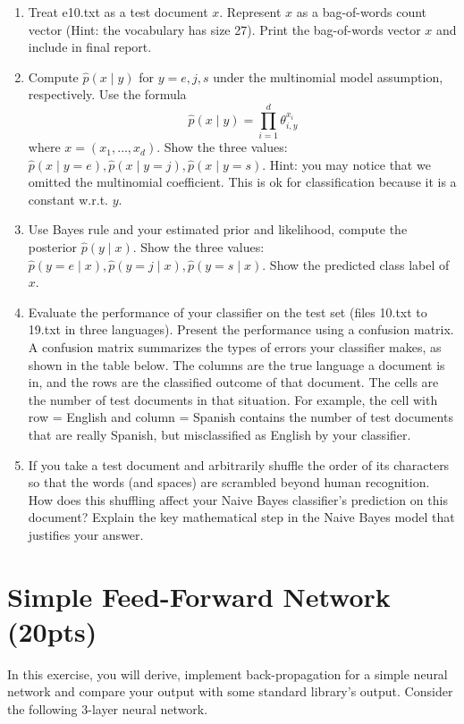 \documentclass[a4paper]{article}
\theoremstyle{definition}
\begin{document}
\begin{enumerate}
	\item
	      Treat e10.txt as a test document $x$.
	      Represent $x$ as a bag-of-words count vector (Hint: the vocabulary has size 27).
	      Print the bag-of-words vector $x$ and include in final report.

	\item
	      Compute $\hat p(x \mid y)$ for $y=e, j, s$ under the multinomial model assumption, respectively.
	      Use the formula
	      $$\hat p(x \mid y) = \prod_{i=1}^d \theta_{i, y}^{x_i}$$
	      where $x=(x_1, \ldots, x_d)$.
	      Show the three values: $\hat p(x \mid y=e), \hat p(x \mid y=j), \hat p(x \mid y=s)$.
	      Hint: you may notice that we omitted the multinomial coefficient.  This is ok for classification because it is a constant w.r.t. $y$.


	\item
	      Use Bayes rule and your estimated prior and likelihood, compute the posterior $\hat p(y \mid x)$.
	      Show the three values: $\hat p(y=e \mid x), \hat p(y=j \mid x), \hat p(y=s \mid x)$.
	      Show the predicted class label of $x$.


	\item
	      Evaluate the performance of your classifier on the test set (files 10.txt to 19.txt in three languages).
	      Present the performance using a confusion matrix. A confusion matrix summarizes the types of errors your classifier makes, as shown in the table below.   The columns are the true language a document is in, and the rows are the classified outcome of that document.  The cells are the number of test documents in that situation.  For example, the cell with row = English and column = Spanish contains the number of test documents that are really Spanish, but misclassified as English by your classifier.

	\item If you take a test document and arbitrarily shuffle the order of its characters so that the words (and spaces) are scrambled beyond human recognition.  How does this shuffling affect your Naive Bayes classifier's prediction on this document?  Explain the key mathematical step in the Naive Bayes model that justifies your answer.

\end{enumerate}

\section{Simple Feed-Forward Network (20pts)}
In this exercise, you will derive, implement back-propagation for a simple neural network and compare your output with some standard library’s output. Consider the following 3-layer neural network.
\end{document}
